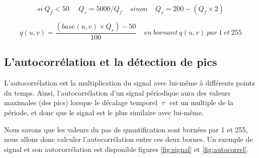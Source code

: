 \documentclass[utf8,final]{stageM2R} %
\begin{document}
\begin{equation}
  si\ Q_f < 50\ \ \ \ \ \  Q_s = 5000 / Q_f\ \ \ \ \  sinon\ \ \ \ \ Q_s = 200 - (Q_f \times 2)
  \label{eqn:jpeg_1}
\end{equation}

\begin{equation}
  q(u,v) = \frac{(base(u,v) \times Q_s) - 50}{100}\ \ \ \ \ en\ bornant\ q(u,v)\ par\ 1\ et\ 255
  \label{eqn:jpeg_2}
\end{equation}

\subsection{L'autocorrélation et la détection de pics}
L'autocorrélation est la multiplication du signal avec lui-même à différents points du temps. Ainsi, l'autocorrélation d'un signal périodique aura des valeurs maximales (des pics) lorsque le décalage temporel $\uptau$ est un multiple de la période, et donc que le signal est le plus similaire avec lui-même.

Nous savons que les valeurs du pas de quantification sont bornées par 1 et 255, nous allons donc calculer l'autocorrélation entre ces deux bornes. Un exemple de signal et son autocorrélation est disponible figures \ref{fig:signal} et \ref{fig:autocorrel}.
\end{document}
